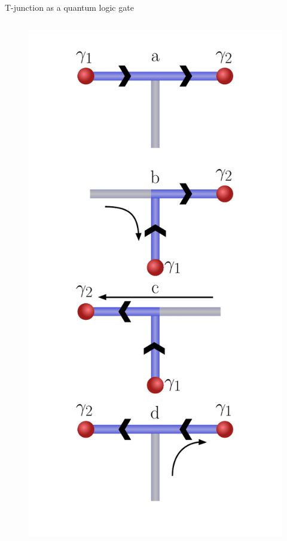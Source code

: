 \documentclass[xcolor=dvipsnames,10pt,aspectratio=169]{beamer}
\begin{document}
  \begin{frame}{T-junction as a quantum logic gate}

    \begin{columns}
      \begin{figure}
        \includegraphics[height=0.85\textheight]{./figures/t-junction-braid.pdf}
      \end{figure}


\end{columns}
\end{frame}
\end{document}
